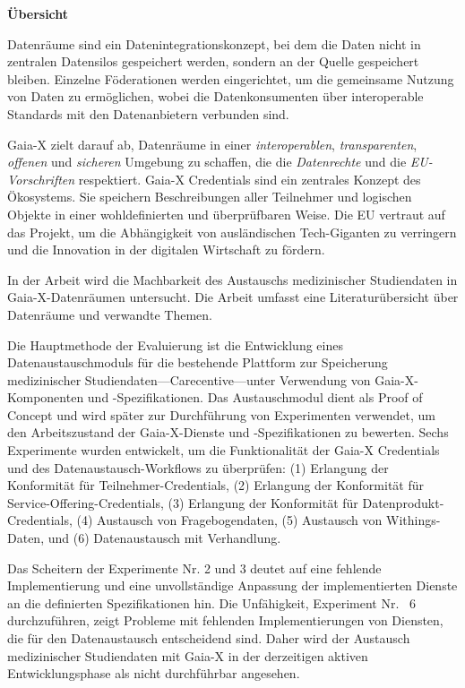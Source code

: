 \documentclass{maddoc}
\begin{document}
\begin{center}
\bfseries
Übersicht
\normalfont
\end{center}

Datenräume sind ein Datenintegrationskonzept, bei dem die Daten nicht in zentralen Datensilos gespeichert werden, sondern an der Quelle gespeichert bleiben.
Einzelne Föderationen werden eingerichtet, um die gemeinsame Nutzung von Daten zu ermöglichen, wobei die Datenkonsumenten über interoperable Standards mit den Datenanbietern verbunden sind.

Gaia-X zielt darauf ab, Datenräume in einer \textit{interoperablen}, \textit{transparenten}, \textit{offenen} und \textit{sicheren} Umgebung zu schaffen, die die \textit{Datenrechte} und die \textit{EU-Vorschriften} respektiert.
Gaia-X Credentials sind ein zentrales Konzept des Ökosystems.
Sie speichern Beschreibungen aller Teilnehmer und logischen Objekte in einer wohldefinierten und überprüfbaren Weise.
Die EU vertraut auf das Projekt, um die Abhängigkeit von ausländischen Tech-Giganten zu verringern und die Innovation in der digitalen Wirtschaft zu fördern.

In der Arbeit wird die Machbarkeit des Austauschs medizinischer Studiendaten in Gaia-X-Datenräumen untersucht.
Die Arbeit umfasst eine Literaturübersicht über Datenräume und verwandte Themen.

Die Hauptmethode der Evaluierung ist die Entwicklung eines Datenaustauschmoduls für die bestehende Plattform zur Speicherung medizinischer Studiendaten---Carecentive---unter Verwendung von Gaia-X-Komponenten und -Spezifikationen.
Das Austauschmodul dient als Proof of Concept und wird später zur Durchführung von Experimenten verwendet, um den Arbeitszustand der Gaia-X-Dienste und -Spezifikationen zu bewerten.
Sechs Experimente wurden entwickelt, um die Funktionalität der Gaia-X Credentials und des Datenaustausch-Workflows zu überprüfen: (1) Erlangung der Konformität für Teilnehmer-Credentials, (2) Erlangung der Konformität für Service-Offering-Credentials, (3) Erlangung der Konformität für Datenprodukt-Credentials, (4) Austausch von Fragebogendaten, (5) Austausch von Withings-Daten, und (6) Datenaustausch mit Verhandlung.

Das Scheitern der Experimente Nr. 2 und 3 deutet auf eine fehlende Implementierung und eine unvollständige Anpassung der implementierten Dienste an die definierten Spezifikationen hin.
Die Unfähigkeit, Experiment Nr. ~6 durchzuführen, zeigt Probleme mit fehlenden Implementierungen von Diensten, die für den Datenaustausch entscheidend sind.
Daher wird der Austausch medizinischer Studiendaten mit Gaia-X in der derzeitigen aktiven Entwicklungsphase als nicht durchführbar angesehen.
\end{document}

